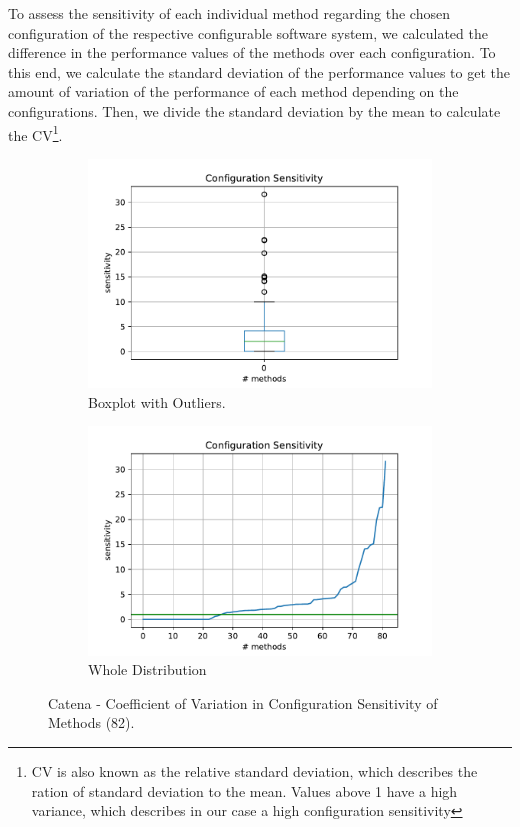 To assess the sensitivity of each individual method regarding the chosen configuration of the respective configurable software system, we calculated the difference in the performance values of the methods over each configuration. To this end, we calculate the standard deviation of the performance values to get the amount of variation of the performance of each method depending on the configurations. Then, we divide the standard deviation by the mean to calculate the \ac{CV}\footnote{\ac{CV} is also known as the relative standard deviation, which describes the ration of standard deviation to the mean. Values above 1 have a high variance, which describes in our case a high configuration sensitivity}.

\begin{figure}[h]
	\centering
	\begin{subfigure}{.5\textwidth}
	  \centering
	  \includegraphics[width=.99\linewidth]{images/Catena_box_conf_sens_cv_with_outl}
	  \caption{Boxplot with Outliers.}
	  \label{fig:c_conf_sens_on_method:sub1}
	\end{subfigure}%
	\begin{subfigure}{.5\textwidth}
	  \centering
	  \includegraphics[width=.99\linewidth]{images/catena_plt_conf_sens_cv_with_outl}
	  \caption{Whole Distribution}
	  \label{fig:c_conf_sens_on_method:sub2}
	\end{subfigure}
	\caption{Catena - Coefficient of Variation in Configuration Sensitivity of Methods (82).}
	\label{fig:c_conf_sens_on_method}
\end{figure}


